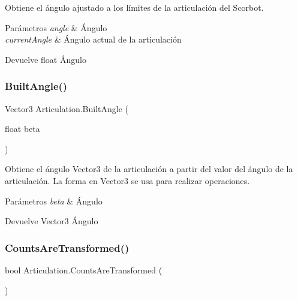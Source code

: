 Obtiene el ángulo ajustado a los límites de la articulación del Scorbot. 
\begin{DoxyParams}{Parámetros}
{\em angle} & Ángulo \\
\hline
{\em current\+Angle} & Ángulo actual de la articulación \\
\hline
\end{DoxyParams}
\begin{DoxyReturn}{Devuelve}
float Ángulo 
\end{DoxyReturn}
\mbox{\label{class_articulation_a421283bcb0bc25871cb63e2664ecf296}} 
\subsubsection{\texorpdfstring{BuiltAngle()}{BuiltAngle()}}
{\footnotesize\ttfamily Vector3 Articulation.\+Built\+Angle (\begin{DoxyParamCaption}\item[{float}]{beta }\end{DoxyParamCaption})\hspace{0.3cm}{\ttfamily [inline]}}

Obtiene el ángulo Vector3 de la articulación a partir del valor del ángulo de la articulación. La forma en Vector3 se usa para realizar operaciones. 
\begin{DoxyParams}{Parámetros}
{\em beta} & Ángulo \\
\hline
\end{DoxyParams}
\begin{DoxyReturn}{Devuelve}
Vector3 Ángulo 
\end{DoxyReturn}
\mbox{\label{class_articulation_aad8aba05576db394129968fe191ccc7c}} 
\subsubsection{\texorpdfstring{CountsAreTransformed()}{CountsAreTransformed()}}
{\footnotesize\ttfamily bool Articulation.\+Counts\+Are\+Transformed (\begin{DoxyParamCaption}{ }\end{DoxyParamCaption})\hspace{0.3cm}{\ttfamily [inline]}}


